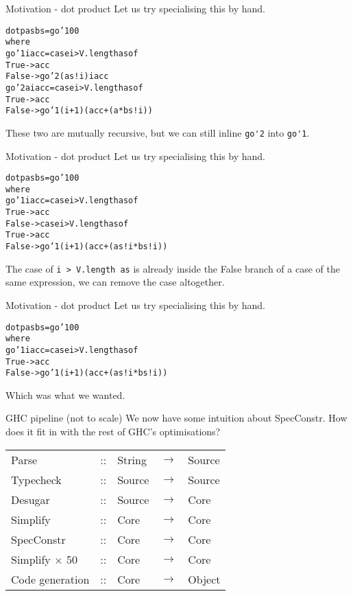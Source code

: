 \documentclass[t]{beamer}
\newcommand{\arr}{$\rightarrow$}
\newcommand{\oomph}[1]{\textcolor[rgb]{0.0,0.5,0.9}{#1}}
\begin{document}
\begin{frame}[fragile]{Motivation - dot product}
Let us try specialising this by hand.
\begin{alltt}
dotp as bs = go'1 0 0
 where
  go'1 i acc = case i > V.length as of
   True  -> acc
   False -> \oomph{go'2 (as!i) i acc}
  go'2 a i acc = case i > V.length as of
   True  -> acc
   False -> \oomph{go'1 (i + 1) (acc + (a * bs!i))}




\end{alltt}
These two are mutually recursive, but we can still inline \verb/go'2/ into \verb/go'1/.
\end{frame}

\begin{frame}[fragile]{Motivation - dot product}
Let us try specialising this by hand.
\begin{alltt}
dotp as bs = go'1 0 0
 where
  go'1 i acc = \oomph{case i > V.length as of}
   True  -> acc
   \oomph{False -> case i > V.length as of}
      True  -> acc
      \oomph{False ->} go'1 (i + 1) (acc + (as!i * bs!i))





\end{alltt}
The case of \verb/i > V.length as/ is already inside the False branch of a case of the same expression,
we can remove the case altogether.
\end{frame}

\begin{frame}[fragile]{Motivation - dot product}
Let us try specialising this by hand.
\begin{alltt}
dotp as bs = go'1 0 0
 where
  go'1 i acc = case i > V.length as of
   True  -> acc
   False -> \oomph{go'1 (i + 1) (acc + (as!i * bs!i))}







\end{alltt}
Which was what we wanted.
\end{frame}





\begin{frame}[fragile]{GHC pipeline (not to scale)}
We now have some intuition about SpecConstr. How does it fit in with the rest of GHC's optimisations?

\begin{tabular}{lllll}
Parse      & :: & String & \arr & Source
\\
Typecheck  & :: & Source & \arr & Source
\\
Desugar     & :: & Source & \arr & Core
\\
Simplify    & :: & Core & \arr & Core
\\
SpecConstr & :: & Core & \arr & Core
\\
Simplify $\times$ 50 & :: & Core & \arr & Core
\\
Code generation & :: & Core & \arr & Object
\end{tabular}
\end{frame}
\end{document}
